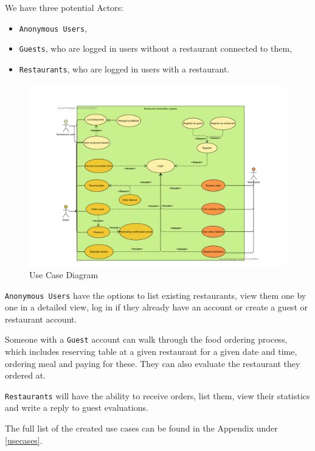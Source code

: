 We have three potential Actors: 

\begin{itemize}
	\item \verb+Anonymous Users+,
	\item \verb+Guests+, who are logged in users without a restaurant connected to them,
	\item \verb+Restaurants+, who are logged in users with a restaurant.
\end{itemize}

 \begin{figure}[!ht]
	\centering
	\includegraphics[width=150mm, keepaspectratio]{figures/UseCaseDiagram}
	\caption{Use Case Diagram} 
	\label{fig:UseCaseDiagram}
\end{figure}

\verb+Anonymous Users+ have the options to list existing restaurants, view them one by one in a detailed view, log in if they already have an account or create a guest or restaurant account. 

Someone with a \verb+Guest+ account can walk through the food ordering process, which includes reserving table at a given restaurant for a given date and time, ordering meal and paying for these. They can also evaluate the restaurant they ordered at.

\verb+Restaurants+ will have the ability to receive orders, list them, view their statistics and write a reply to guest evaluations.

The full list of the created use cases can be found in the Appendix under \ref{usecases}.

